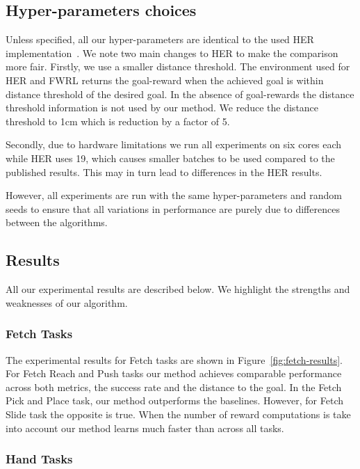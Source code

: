 %


\subsection{Hyper-parameters choices}
Unless specified, all our hyper-parameters are identical to the used HER
implementation~\citep{dhariwal2017baselines}. We note two main changes
to HER to make the comparison more fair. Firstly,
we use a smaller distance threshold.
The environment used for HER and FWRL returns the goal-reward when the
achieved goal is within distance threshold of the desired goal. In the absence
of goal-rewards the distance threshold information is not used by our
method.
We reduce the distance threshold to 1cm which
is reduction by a factor of 5.

Secondly, due to hardware limitations we run all experiments on six
cores each
while HER uses 19, which causes smaller batches to be used compared to the
published results. This may in turn lead to differences in the HER results.

However, all experiments are run with the same hyper-parameters and
random seeds to ensure that all variations in performance are purely due
to differences between the algorithms.

\subsection{Results}
All our experimental results are described below. We highlight the strengths and
weaknesses of our algorithm.

\subsubsection{Fetch Tasks}

The experimental results for Fetch tasks are shown in
Figure~\ref{fig:fetch-results}. For Fetch Reach and Push tasks our method achieves comparable performance
across both metrics, the success rate and the distance to the goal. In the Fetch
Pick and Place task, our method outperforms the baselines. However, for Fetch
Slide task the opposite is true.
When the number of reward computations is take into account our method learns
much faster than across all tasks.

\subsubsection{Hand Tasks}

